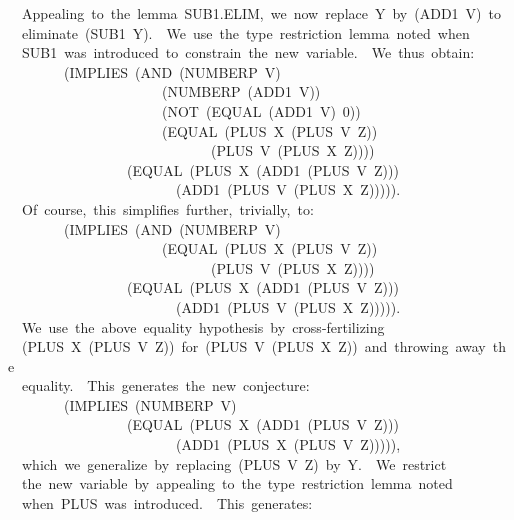 \documentclass[10pt]{book}
\newenvironment{pubasis}{\begin{flushleft}}{\end{flushleft}}
\begin{document}
\begin{pubasis}
~~Appealing~to~the~lemma~SUB1.ELIM,~we~now~replace~Y~by~(ADD1~V)~to\\
~~eliminate~(SUB1~Y).~~We~use~the~type~restriction~lemma~noted~when\\
~~SUB1~was~introduced~to~constrain~the~new~variable.~~We~thus~obtain:\\

~~~~~~~~(IMPLIES~(AND~(NUMBERP~V)\\
~~~~~~~~~~~~~~~~~~~~~~(NUMBERP~(ADD1~V))\\
~~~~~~~~~~~~~~~~~~~~~~(NOT~(EQUAL~(ADD1~V)~0))\\
~~~~~~~~~~~~~~~~~~~~~~(EQUAL~(PLUS~X~(PLUS~V~Z))\\
~~~~~~~~~~~~~~~~~~~~~~~~~~~~~(PLUS~V~(PLUS~X~Z))))\\
~~~~~~~~~~~~~~~~~(EQUAL~(PLUS~X~(ADD1~(PLUS~V~Z)))\\
~~~~~~~~~~~~~~~~~~~~~~~~(ADD1~(PLUS~V~(PLUS~X~Z))))).\\

~~Of~course,~this~simplifies~further,~trivially,~to:\\

~~~~~~~~(IMPLIES~(AND~(NUMBERP~V)\\
~~~~~~~~~~~~~~~~~~~~~~(EQUAL~(PLUS~X~(PLUS~V~Z))\\
~~~~~~~~~~~~~~~~~~~~~~~~~~~~~(PLUS~V~(PLUS~X~Z))))\\
~~~~~~~~~~~~~~~~~(EQUAL~(PLUS~X~(ADD1~(PLUS~V~Z)))\\
~~~~~~~~~~~~~~~~~~~~~~~~(ADD1~(PLUS~V~(PLUS~X~Z))))).\\

~~We~use~the~above~equality~hypothesis~by~cross-fertilizing\\
~~(PLUS~X~(PLUS~V~Z))~for~(PLUS~V~(PLUS~X~Z))~and~throwing~away~the\\
~~equality.~~This~generates~the~new~conjecture:\\

~~~~~~~~(IMPLIES~(NUMBERP~V)\\
~~~~~~~~~~~~~~~~~(EQUAL~(PLUS~X~(ADD1~(PLUS~V~Z)))\\
~~~~~~~~~~~~~~~~~~~~~~~~(ADD1~(PLUS~X~(PLUS~V~Z))))),\\

~~which~we~generalize~by~replacing~(PLUS~V~Z)~by~Y.~~We~restrict\\
~~the~new~variable~by~appealing~to~the~type~restriction~lemma~noted\\
~~when~PLUS~was~introduced.~~This~generates:\\


\end{pubasis}
\end{document}
